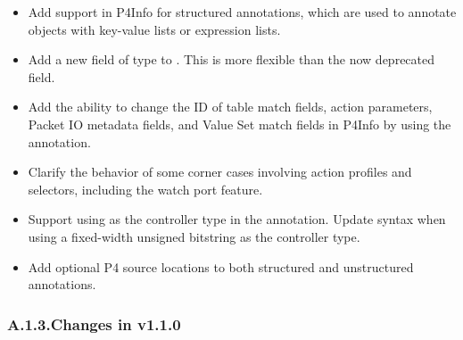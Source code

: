 \documentclass[11pt]{article}
\begin{document}
{\begin{itemize}[noitemsep,topsep=\mdcompacttopsep]
\item{}Add support in P4Info for structured annotations, which are used to annotate
objects with key-value lists or expression lists.%

\item{}Add a new  field of type  to . This is more
flexible than the now deprecated  field.%

\item{}Add the ability to change the ID of table match fields, action parameters,
Packet IO metadata fields, and Value Set match fields in P4Info by using the
 annotation.%

\item{}Clarify the behavior of some corner cases involving action profiles and
selectors, including the watch port feature.%

\item{}Support using  as the controller type in the 
annotation. Update syntax when using a fixed-width unsigned bitstring as the
controller type.%

\item{}Add optional P4 source locations to both structured and unstructured
annotations.%
\end{itemize}%

\subsubsection{A.1.3.\hspace*{0.5em}Changes in v1.1.0}\label{sec-changes-in-v110}%

}
\end{document}
